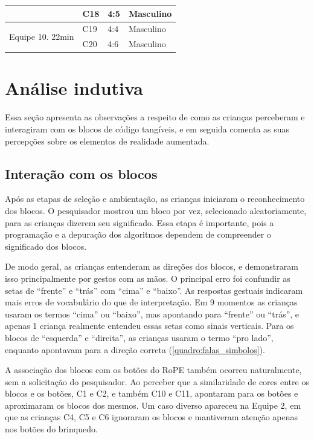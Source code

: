 \begin{quadro}[!h]
{\begin{footnotesize}
{\begin{tabular}{|l|l|l|l|}
                                                                                        & C18              & 4:5                            & Masculino \\ 
            \hline
            \multirow{2}{*}{Equipe 10. 22min}               & C19              & 4:4                            & Masculino \\ 
            \cline{2-4}
                                                                                        & C20              & 4:6                            & Masculino  \\
            \hline
            \end{tabular}
        }
        \end{footnotesize}
    }
\end{quadro}

\section{Análise indutiva}
Essa seção apresenta as observações a respeito de como as crianças perceberam e interagiram com os blocos de código tangíveis, e em seguida comenta as suas percepções sobre os elementos de realidade aumentada. 

\subsection{Interação com os blocos}

Após as etapas de seleção e ambientação, as crianças iniciaram o reconhecimento dos blocos. O pesquisador mostrou um bloco por vez, selecionado aleatoriamente, para as crianças dizerem seu significado. Essa etapa é importante, pois a programação e a depuração dos algoritmos dependem de compreender o significado dos blocos. 

De modo geral, as crianças entenderam as direções dos blocos, e demonstraram isso principalmente por gestos com as mãos. O principal erro foi confundir as setas de “frente” e “trás” com “cima” e “baixo”. As respostas gestuais indicaram mais erros de vocabulário do que de interpretação. Em 9 momentos as crianças usaram os termos “cima” ou “baixo”, mas apontando para “frente” ou “trás”, e apenas 1 criança realmente entendeu essas setas como sinais verticais. Para os blocos de “esquerda” e “direita”, as crianças usaram o termo “pro lado”, enquanto apontavam para a direção correta (\autoref{quadro:falas_simbolos}).

A associação dos blocos com os botões do RoPE também ocorreu naturalmente, sem a solicitação do pesquisador. Ao perceber que a similaridade de cores entre os blocos e os botões, C1 e C2, e também C10 e C11, apontaram para os botões e aproximaram os blocos dos mesmos. Um caso diverso apareceu na Equipe 2, em que as crianças C4, C5 e C6 ignoraram os blocos e mantiveram atenção apenas nos botões do brinquedo.

